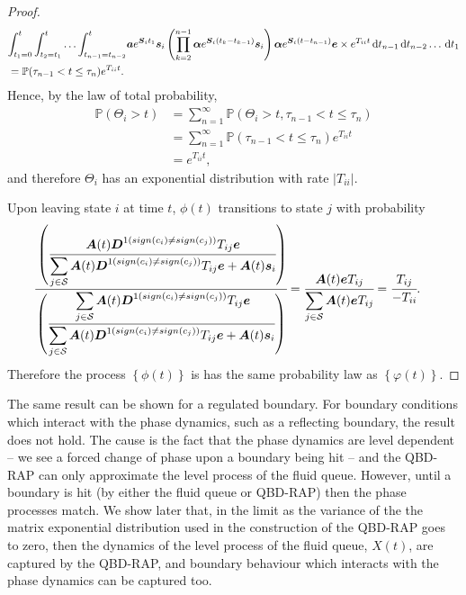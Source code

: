 \begin{proof}
\begin{align*}
		& \displaystyle{\int_{t_1=0}^t\int_{t_2=t_1}^t\hdots\int_{t_{n-1}=t_{n-2}}^t} \boldsymbol a e^{\boldsymbol{S}_it_1}\boldsymbol s_i 
			\left(\prod_{k=2}^{n-1} \boldsymbol \alpha e^{\boldsymbol{S}_i(t_k-t_{k-1})} \boldsymbol s_i\right) \boldsymbol \alpha e^{\boldsymbol{S}_i(t-t_{n-1})}\boldsymbol e
			\times e^{T_{ii}t} \, \mathrm{d} t_{n-1}\, \mathrm{d} t_{n-2}\hdots\, \mathrm{d} t_{1}
		\\&= \mathbb P(\tau_{n-1}< t \leq \tau_n)\displaystyle{  e^{T_{ii}t} }.
	\end{align*}
	Hence, by the law of total probability, 
	\begin{align*}
		\mathbb P(\Theta_i> t) &= \sum_{n=1}^\infty \mathbb P(\Theta_i> t, \tau_{n-1} < t \leq \tau_n)
		\\&= \sum_{n=1}^\infty \mathbb P(\tau_{n-1} < t \leq \tau_n)\displaystyle{  e^{T_{ii}t} }
		\\&= e^{T_{ii}t},
	\end{align*}
	and therefore \(\Theta_i\) has an exponential distribution with rate \(|T_{ii}|\). 
	
	Upon leaving state \(i\) at time \(t\), \({\phi}(t)\) transitions to state \(j\) with probability 
	\begin{align*}
            	\cfrac{\left(\cfrac{\boldsymbol A(t) \boldsymbol{D}^{1(sign(c_i)\neq sign(c_j))}T_{ij}\boldsymbol e}{\displaystyle\sum_{j\in\mathcal S}\boldsymbol A(t) \boldsymbol{D}^{1(sign(c_i)\neq sign(c_j))}T_{ij}\boldsymbol e + \boldsymbol A(t) \boldsymbol s_i}\right)}
            	{\left(\cfrac{\displaystyle\sum_{j\in\mathcal S}\boldsymbol A(t) \boldsymbol{D}^{1(sign(c_i)\neq sign(c_j))}T_{ij}\boldsymbol e}{\displaystyle\sum_{j\in\mathcal S}\boldsymbol A(t) \boldsymbol{D}^{1(sign(c_i)\neq sign(c_j))}T_{ij}\boldsymbol e + \boldsymbol A(t) \boldsymbol s_i}\right)}
            	&=\cfrac{\boldsymbol A(t) \boldsymbol eT_{ij}}
            	{\displaystyle\sum_{j\in\mathcal S}\boldsymbol A(t) \boldsymbol eT_{ij}}
	= \cfrac{T_{ij}}
            	{-T_{ii}}.
	 \end{align*}
	 Therefore the process \(\left\{{\phi}(t)\right\}\) is has the same probability law as \(\left\{\varphi(t)\right\}\).
\end{proof}
\begin{rem}
The same result can be shown for a regulated boundary. For boundary conditions which interact with the phase dynamics, such as a reflecting boundary, the result does not hold. The cause is the fact that the phase dynamics are level dependent -- we see a forced change of phase upon a boundary being hit -- and the QBD-RAP can only approximate the level process of the fluid queue. However, until a boundary is hit (by either the fluid queue or QBD-RAP) then the phase processes match. We show later that, in the limit as the variance of the the matrix exponential distribution used in the construction of the QBD-RAP goes to zero, then the dynamics of the level process of the fluid queue, \(X(t)\), are captured by the QBD-RAP, and boundary behaviour which interacts with the phase dynamics can be captured too.
\end{rem}

